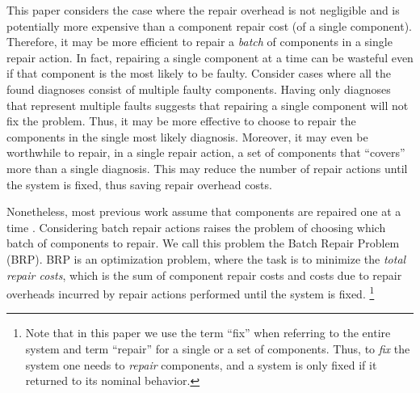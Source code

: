 \documentclass[a4paper,11pt]{report}
\newcommand\meir[1]{\textcolor{red}{meir: #1}}
\newcommand\roni[1]{\textcolor{green}{roni: #1}}
\begin{document}
This paper considers the case where the repair overhead is not negligible and is potentially more expensive than a component repair cost (of a single component). 
Therefore, it may be more efficient to repair a \emph{batch} of components in a single repair action. 
In fact, repairing a single component at a time can be wasteful even if that component is the most likely to be faulty. Consider cases where all the found diagnoses consist of multiple faulty components. Having only diagnoses that represent multiple faults suggests that repairing a single component will not fix the problem. Thus, it may be more effective to choose to repair the components in the single most likely diagnosis. Moreover, it may even be worthwhile to repair, in a single repair action, a set of components that ``covers'' more than a single diagnosis. This may reduce the number of repair actions until the system is fixed, thus saving repair overhead costs. 


Nonetheless, most previous work assume that components are repaired one at a time \cite{heckerman1995decision,friedrich1992choosing,Nyberg12,Torta14}. Considering batch repair actions raises 
the problem of choosing which batch of components to repair. 
We call this problem the Batch Repair Problem (BRP). BRP is an optimization problem, where the task is to minimize the {\em total repair costs}, which is the sum of component repair costs and costs due to repair overheads incurred by repair actions performed until the system is fixed. \footnote{%
Note that in this paper we use the term  ``fix'' when referring to the entire system and term ``repair'' for a single or a set of components.  Thus, 
to {\em fix} the system one needs to {\em repair} components, and a system is only fixed if it returned to its nominal behavior.}
\end{document}
